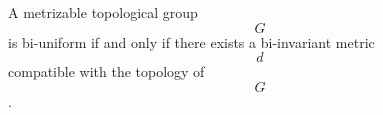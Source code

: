 A metrizable topological group $$G$$ is bi-uniform if and only if there exists a bi-invariant metric $$d$$ compatible with the topology of $$G$$.
